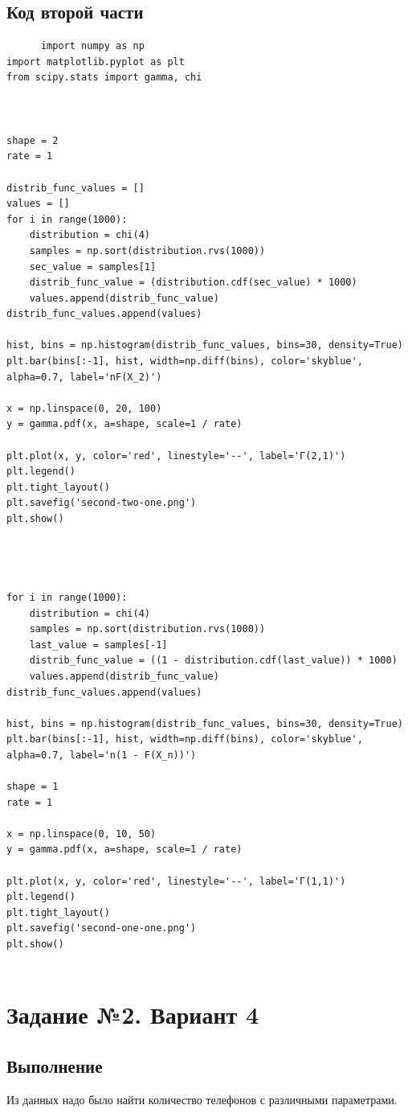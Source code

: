 \documentclass{article}
\begin{document}
\subsection{Код второй части}
\begin{verbatim}
      import numpy as np
import matplotlib.pyplot as plt
from scipy.stats import gamma, chi



shape = 2
rate = 1

distrib_func_values = []
values = []
for i in range(1000):
    distribution = chi(4)
    samples = np.sort(distribution.rvs(1000))
    sec_value = samples[1]
    distrib_func_value = (distribution.cdf(sec_value) * 1000)
    values.append(distrib_func_value)
distrib_func_values.append(values)

hist, bins = np.histogram(distrib_func_values, bins=30, density=True)
plt.bar(bins[:-1], hist, width=np.diff(bins), color='skyblue', alpha=0.7, label='nF(X_2)')

x = np.linspace(0, 20, 100)
y = gamma.pdf(x, a=shape, scale=1 / rate)

plt.plot(x, y, color='red', linestyle='--', label='Г(2,1)')
plt.legend()
plt.tight_layout()
plt.savefig('second-two-one.png')
plt.show()




for i in range(1000):
    distribution = chi(4)
    samples = np.sort(distribution.rvs(1000))
    last_value = samples[-1]
    distrib_func_value = ((1 - distribution.cdf(last_value)) * 1000)
    values.append(distrib_func_value)
distrib_func_values.append(values)

hist, bins = np.histogram(distrib_func_values, bins=30, density=True)
plt.bar(bins[:-1], hist, width=np.diff(bins), color='skyblue', alpha=0.7, label='n(1 - F(X_n))')

shape = 1
rate = 1

x = np.linspace(0, 10, 50)
y = gamma.pdf(x, a=shape, scale=1 / rate)

plt.plot(x, y, color='red', linestyle='--', label='Г(1,1)')
plt.legend()
plt.tight_layout()
plt.savefig('second-one-one.png')
plt.show()


\end{verbatim}

\section{Задание №2. Вариант 4}
\subsection{Выполнение}
Из данных надо было найти количество телефонов с различными параметрами.
\end{document}
